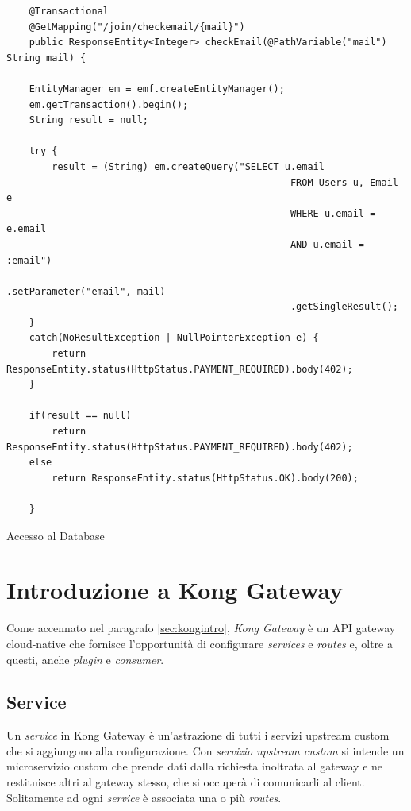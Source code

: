 \begin{algorithm}
\centering
\begin{verbatim}
	@Transactional
	@GetMapping("/join/checkemail/{mail}")
	public ResponseEntity<Integer> checkEmail(@PathVariable("mail") String mail) {

	EntityManager em = emf.createEntityManager();
	em.getTransaction().begin();
	String result = null;

	try {
		result = (String) em.createQuery("SELECT u.email
                                                  FROM Users u, Email e
                                                  WHERE u.email = e.email 
                                                  AND u.email = :email")
                                                  .setParameter("email", mail)
                                                  .getSingleResult();
	}
	catch(NoResultException | NullPointerException e) {
		return ResponseEntity.status(HttpStatus.PAYMENT_REQUIRED).body(402);
	}

	if(result == null)
		return ResponseEntity.status(HttpStatus.PAYMENT_REQUIRED).body(402);
	else
		return ResponseEntity.status(HttpStatus.OK).body(200);

	}
\end{verbatim}
\caption{Accesso al Database}\label{alg:checkemail}
\end{algorithm}


\section{Introduzione a Kong Gateway}\label{sec:kongprog}
Come accennato nel paragrafo \ref{sec:kongintro}, \emph{Kong Gateway} è un API gateway cloud-native che fornisce l'opportunità di configurare \emph{services} e \emph{routes} e, oltre a questi, anche \emph{plugin} e \emph{consumer}.
\subsection{Service}\label{sec:kongservice}
Un \emph{service} in Kong Gateway è un'astrazione di tutti i servizi upstream custom che si aggiungono alla configurazione. Con \emph{servizio upstream custom} si intende un microservizio custom che prende dati dalla richiesta inoltrata al gateway e ne restituisce altri al gateway stesso, che si occuperà di comunicarli al client.\\
Solitamente ad ogni \emph{service} è associata una o più \emph{routes}.\\

